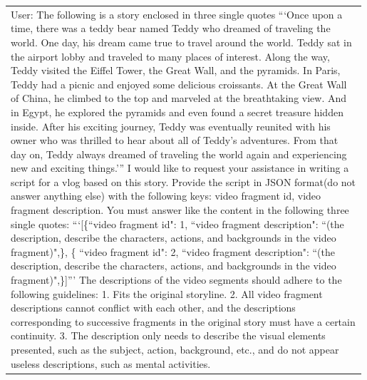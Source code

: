 \begin{table}[h!]\centering
    \begin{minipage}{0.98\linewidth}\vspace{0mm}    
    \centering
    \begin{tcolorbox} 
        \centering
        \begin{tabular}{p{0.99\linewidth}}
        \begin{minipage}{0.99\linewidth}
User: The following is a story enclosed in three single quotes ```\textcolor[RGB]{243, 156, 18}{Once upon a time, there was a teddy bear named Teddy who dreamed of traveling the world. One day, his dream came true to travel around the world. Teddy sat in the airport lobby and traveled to many places of interest. Along the way, Teddy visited the Eiffel Tower, the Great Wall, and the pyramids. In Paris, Teddy had a picnic and enjoyed some delicious croissants. At the Great Wall of China, he climbed to the top and marveled at the breathtaking view. And in Egypt, he explored the pyramids and even found a secret treasure hidden inside. After his exciting journey, Teddy was eventually reunited with his owner who was thrilled to hear about all of Teddy's adventures. From that day on, Teddy always dreamed of traveling the world again and experiencing new and exciting things.}''' I would like to request your assistance in writing a script for a vlog based on this story. Provide the script in JSON format(do not answer anything else) with the following keys: video fragment id, video fragment description. You must answer like the content in the following three single quotes: ```[\{``video fragment id": 1, ``video fragment description": ``(the description, describe the characters, actions, and backgrounds in the video fragment)",\}, \{
``video fragment id": 2, ``video fragment description": ``(the description, describe the characters, actions, and backgrounds in the video fragment)",\}]'''  The descriptions of the video segments should adhere to the following guidelines: 1. Fits the original storyline. 2. All video fragment descriptions cannot conflict with each other, and the descriptions corresponding to successive fragments in the original story must have a certain continuity. 3. The description only needs to describe the visual elements presented, such as the subject, action, background, etc., and do not appear useless descriptions, such as mental activities.


\end{minipage}
\end{tabular}
\end{tcolorbox}
\end{minipage}
\end{table}
